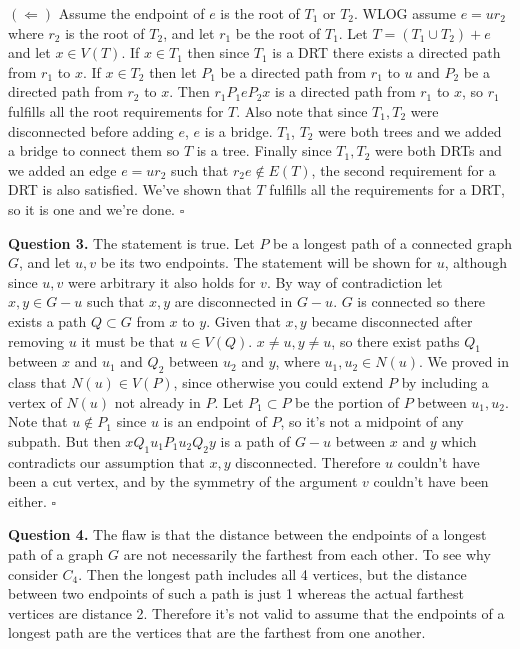\documentclass[letterpaper, reqno,11pt]{article}
\begin{document}
$(\Leftarrow)$ Assume the endpoint of $e$ is the root of $T_1$ or $T_2$. WLOG assume $e=ur_2$ where $r_2$ is the root of $T_2$, and let $r_1$ be the root of $T_1$. Let $T=(T_1\cup T_2)+e$ and let $x\in V(T)$. If $x\in T_1$ then since $T_1$ is a DRT there exists a directed path from $r_1$ to $x$. If $x\in T_2$ then let $P_1$ be a directed path from $r_1$ to $u$ and $P_2$ be a directed path from $r_2$ to $x$. Then $r_1P_1eP_2x$ is a directed path from $r_1$ to $x$, so $r_1$ fulfills all the root requirements for $T$. Also note that since $T_1,T_2$ were disconnected before adding $e$, $e$ is a bridge. $T_1$, $T_2$ were both trees and we added a bridge to connect them so $T$ is a tree. Finally since $T_1,T_2$ were both DRTs and we added an edge $e=ur_2$ such that $r_2e\notin E(T)$, the second requirement for a DRT is also satisfied. We've shown that $T$ fulfills all the requirements for a DRT, so it is one and we're done. $\square$


{\medskip\noindent\bf Question 3.} The statement is true. Let $P$ be a longest path of a connected graph $G$, and let $u,v$ be its two endpoints. The statement will be shown for $u$, although since $u,v$ were arbitrary it also holds for $v$. By way of contradiction let $x,y\in G-u$ such that $x,y$ are disconnected in $G-u$. $G$ is connected so there exists a path $Q\subset G$ from $x$ to $y$. Given that $x,y$ became disconnected after removing $u$ it must be that $u\in V(Q)$. $x\neq u,y\neq u$, so there exist paths $Q_1$ between $x$ and $u_1$ and $Q_2$ between $u_2$ and $y$, where $u_1,u_2\in N(u)$. We proved in class that $N(u)\in V(P)$, since otherwise you could extend $P$ by including a vertex of $N(u)$ not already in $P$. Let $P_1\subset P$ be the portion of $P$ between $u_1,u_2$. Note that $u\notin P_1$ since $u$ is an endpoint of $P$, so it's not a midpoint of any subpath. But then $xQ_1u_1P_1u_2Q_2y$ is a path of $G-u$ between $x$ and $y$ which contradicts our assumption that $x,y$ disconnected. Therefore $u$ couldn't have been a cut vertex, and by the symmetry of the argument $v$ couldn't have been either. $\square$

{\medskip\noindent\bf Question 4.} The flaw is that the distance between the endpoints of a longest path of a graph $G$ are not necessarily the farthest from each other. To see why consider $C_4$. Then the longest path includes all 4 vertices, but the distance between two endpoints of such a path is just 1 whereas the actual farthest vertices are distance 2. Therefore it's not valid to assume that the endpoints of a longest path are the vertices that are the farthest from one another. 
\end{document}
